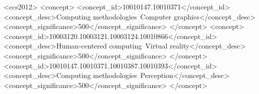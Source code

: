 %
%
  
\begin{CCSXML}
<ccs2012>
<concept>
<concept_id>10010147.10010371</concept_id>
<concept_desc>Computing methodologies~Computer graphics</concept_desc>
<concept_significance>500</concept_significance>
</concept>
<concept>
<concept_id>10003120.10003121.10003124.10010866</concept_id>
<concept_desc>Human-centered computing~Virtual reality</concept_desc>
<concept_significance>500</concept_significance>
</concept>
<concept_id>10010147.10010371.10010387.10010393</concept_id>
<concept_desc>Computing methodologies~Perception</concept_desc>
<concept_significance>500</concept_significance>
</concept>
\end{CCSXML}


